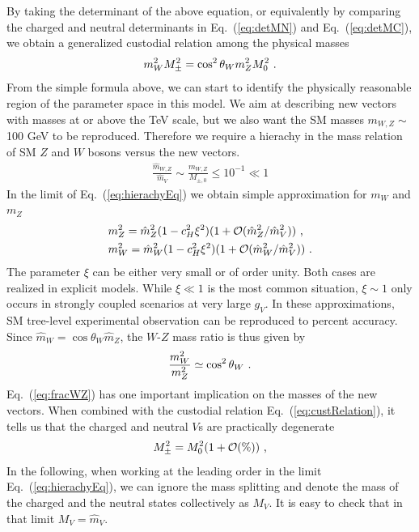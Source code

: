 By taking the determinant of the above equation, or equivalently by comparing the charged and neutral determinants in Eq.~(\ref{eq:detMN}) and Eq.~(\ref{eq:detMC}), we obtain a generalized custodial relation among the physical masses
\begin{align}
  \label{eq:custRelation}
m_{W}^{2}M_{\pm}^{2}=\cos^{2}\theta_{W}m_{Z}^{2}M_{0}^{2}\textup{ .}
\end{align}
From the simple formula above, we can start to identify the physically reasonable region of the parameter space in this model. We aim at describing new vectors with masses at or above the TeV scale, but we also want the SM masses $m_{W,Z} \sim$ 100 GeV to be reproduced. Therefore we require a hierachy in the mass relation of SM $Z$ and $W$ bosons versus the new vectors.
\begin{align}
  \label{eq:hierachyEq}
  \frac{\hat{m}_{W,Z}}{\hat{m}_{V}}\sim \frac{m_{W,Z}}{M_{\pm ,0}}\leq10^{-1}\ll1
\end{align}
In the limit of Eq.~(\ref{eq:hierachyEq}) we obtain simple approximation for $m_{W}$ and $m_{Z}$
\begin{align}
  &m_{Z}^{2}=\hat{m}_{Z}^{2}(1-c_{H}^{2}\xi^{2})(1+\mathcal{O}(\hat{m}_{Z}^{2}/\hat{m}_{V}^{2}))\textup{ ,}\nonumber\\
  &m_{W}^{2}=\hat{m}_{W}^{2}(1-c_{H}^{2}\xi^{2})(1+\mathcal{O}(\hat{m}_{W}^{2}/\hat{m}_{V}^{2}))\textup{ .}
\end{align}
The parameter $\xi$ can be either very small or of order unity. Both cases are realized in explicit models. While $\xi\ll1$ is the most common situation, $\xi\sim1$ only occurs in strongly coupled scenarios at very large $g_{V}$. In these approximations, SM tree-level experimental observation can be reproduced to percent accuracy.
\newline Since $\hat{m}_{W}=\cos\theta_{W}\hat{m}_{Z}$, the $W$-$Z$ mass ratio is thus given by
\begin{align}
  \label{eq:fracWZ}
  \frac{m_{W}^{2}}{m_{Z}^{2}}\simeq \cos^{2}{\theta_{W}}\textup{ .}
\end{align}
Eq.~(\ref{eq:fracWZ}) has one important implication on the masses of the new vectors. When combined with the custodial relation Eq.~(\ref{eq:custRelation}), it tells us that the charged and neutral $V$s are practically degenerate
\begin{align}
  M_{\pm}^{2}=M_{0}^{2}(1+\mathcal{O}(\%))\textup{ ,}
\end{align}
In the following, when working at the leading order in the limit Eq.~(\ref{eq:hierachyEq}), we can ignore the mass splitting and denote the mass of the charged and the neutral states collectively as $M_{V}$. It is easy to check that in that limit $M_{V}=\hat{m}_{V}$.

